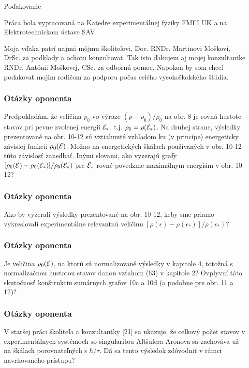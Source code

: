 \documentclass[
	11pt, %
]{beamer}
\begin{document}
\begin{frame}[plain] %
	\begin{center}
		{\Huge Poďakovanie}
		
		\bigskip\bigskip %
	\end{center}
Práca bola vypracovaná na Katedre experimentálnej fyziky FMFI UK a na Elektrotechnickom ústave SAV.

Moja vďaka patrí najmä môjmu školiteľovi, Doc. RNDr. Martinovi Moškovi, DrSc. za podklady a ochotu konzultovať.
Tak isto ďakujem aj mojej konzultantke RNDr. Antónii Moškovej, CSc. za odbornú pomoc. Napokon by som chcel poďakovať mojim rodičom
za podporu počas celého vysokoškolského štúdia.
\end{frame}

\begin{frame}
\frametitle{Otázky oponenta}
Predpokladám, že veličina $\rho_0$ vo výraze $(\rho - \rho_0)/\rho_0$ na obr. 8 je rovná hustote stavov
pri pevne zvolenej energii $\mathcal{E}_*$, t.j. $\rho_0 = \rho(\mathcal{E}_*)$. Na druhej strane, výsledky prezentované na obr. 10-12 sú vztiahnuté vzhľadom ku (v princípe) energeticky závislej funkcii
$\rho_0(\mathcal{E})$. Možno na energetických škálach používaných v obr. 10-12 túto závislosť zanedbať. Inými slovami, ako vyzerajú grafy $[\rho_0(\mathcal{E})-\rho_0(\mathcal{E}_*)]/\rho_0(\mathcal{E}_*)$ pre $\mathcal{E}_*$ rovné povedzme
maximálnym energiám v obr. 10-12?
\end{frame}

\begin{frame}
\frametitle{Otázky oponenta}
Ako by vyzerali výsledky prezentované na obr. 10-12, keby sme priamo vykresľovali
experimentálne relevantnú veličinu $[\rho(\epsilon)-\rho(\epsilon_*)]/ρ(\epsilon_*)$?
\end{frame}
\begin{frame}
\frametitle{Otázky oponenta}
Je veličina $\rho_0(\mathcal{E})$, na ktorú sú normalizované výsledky v kapitole 4, totožná s normalizačnou hustotou stavov danou vzťahom (63) v kapitole 2? Ovplyvní táto skutočnosť
konštrukciu sumárnych grafov 10c a 10d (a podobne pre obr. 11 a 12)?
\end{frame}
\begin{frame}
\frametitle{Otázky oponenta}
 V staršej práci školiteľa a konzultantky [21] sa ukazuje, že celkový počet stavov v
experimentálnych systémoch so singularitou Aľtšulera-Aronova sa zachováva už na
škálach porovnateľných s $\hbar/\tau$. Dá sa tento výsledok zdôvodniť v rámci navrhovaného
prístupu?
\end{frame}
\end{document}
